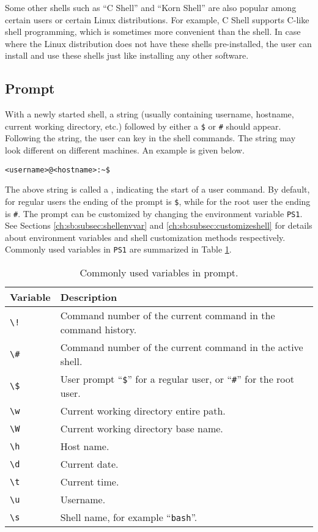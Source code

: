 {Some other shells such as ``C Shell'' and ``Korn Shell'' are also popular among certain users or certain Linux distributions. For example, C Shell supports C-like shell programming, which is sometimes more convenient than the shell. In case where the Linux distribution does not have these shells pre-installed, the user can install and use these shells just like installing any other software.

\subsection{Prompt}

With a newly started shell, a string (usually containing username, hostname, current working directory, etc.) followed by either a \verb|$| or \verb|#| should appear. Following the string, the user can key in the shell commands. The string may look different on different machines. An example is given below.
\begin{lstlisting}
<username>@<hostname>:~$
\end{lstlisting}

The above string is called a , indicating the start of a user command. By default, for regular users the ending of the prompt is \verb|$|, while for the root user the ending is \verb|#|. The prompt can be customized by changing the environment variable \verb|PS1|. See Sections \ref{ch:sb:subsec:shellenvvar} and \ref{ch:sb:subsec:customizeshell} for details about environment variables and shell customization methods respectively. Commonly used variables in \verb|PS1| are summarized in Table \ref{ch:sb:tab:promptvariable}.

\begin{table}
	\centering \caption{Commonly used variables in prompt.}\label{ch:sb:tab:promptvariable}
	\begin{tabularx}{\textwidth}{lX}
		\hline
		Variable & Description \\ \hline
		\verb|\!| & Command number of the current command in the command history. \\ 
		\verb|\#| & Command number of the current command in the active shell. \\ 
		\verb|\$| & User prompt ``\verb|$|'' for a regular user, or ``\verb|#|'' for the root user. \\
		\verb|\w| & Current working directory entire path. \\ 
		\verb|\W| & Current working directory base name. \\ 
		\verb|\h| & Host name. \\ 
		\verb|\d| & Current date. \\ 
		\verb|\t| & Current time. \\ 
		\verb|\u| & Username. \\ 
		\verb|\s| & Shell name, for example ``\verb|bash|''. \\ 
		\hline
	\end{tabularx}
\end{table}

}
